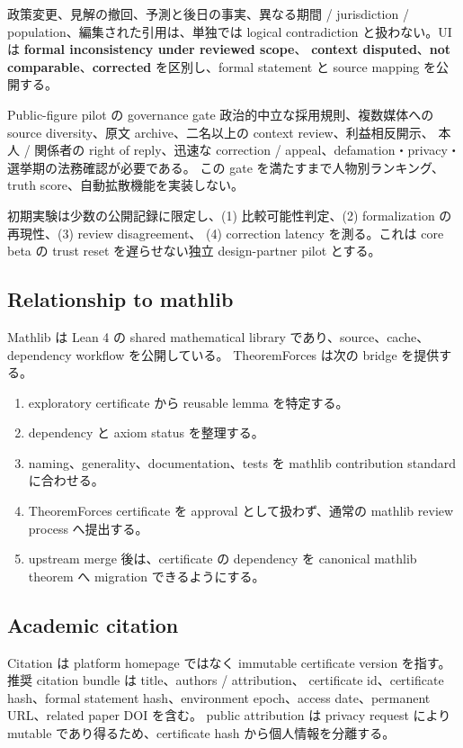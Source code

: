 \documentclass[a4paper,11pt]{ltjsarticle}
\newcommand{\term}[1]{\textbf{\color{TFNavy}#1}}
\begin{document}
政策変更、見解の撤回、予測と後日の事実、異なる期間 / jurisdiction / population、編集された引用は、単独では
logical contradiction と扱わない。UI は \term{formal inconsistency under reviewed scope}、
\term{context disputed}、\term{not comparable}、\term{corrected} を区別し、formal statement と source mapping を公開する。

\begin{warningbox}{Public-figure pilot の governance gate}
政治的中立な採用規則、複数媒体への source diversity、原文 archive、二名以上の context review、利益相反開示、
本人 / 関係者の right of reply、迅速な correction / appeal、defamation・privacy・選挙期の法務確認が必要である。
この gate を満たすまで人物別ランキング、truth score、自動拡散機能を実装しない。
\end{warningbox}

初期実験は少数の公開記録に限定し、(1) 比較可能性判定、(2) formalization の再現性、(3) review disagreement、
(4) correction latency を測る。これは core beta の trust reset を遅らせない独立 design-partner pilot とする。

\subsection{Relationship to mathlib}

Mathlib は Lean 4 の shared mathematical library であり、source、cache、dependency workflow を公開している\cite{mathlib}。
TheoremForces は次の bridge を提供する。

\begin{enumerate}
  \item exploratory certificate から reusable lemma を特定する。
  \item dependency と axiom status を整理する。
  \item naming、generality、documentation、tests を mathlib contribution standard に合わせる。
  \item TheoremForces certificate を approval として扱わず、通常の mathlib review process へ提出する。
  \item upstream merge 後は、certificate の dependency を canonical mathlib theorem へ migration できるようにする。
\end{enumerate}

\subsection{Academic citation}

Citation は platform homepage ではなく immutable certificate version を指す。推奨 citation bundle は title、authors / attribution、
certificate id、certificate hash、formal statement hash、environment epoch、access date、permanent URL、related paper DOI を含む。
public attribution は privacy request により mutable であり得るため、certificate hash から個人情報を分離する。
\end{document}
